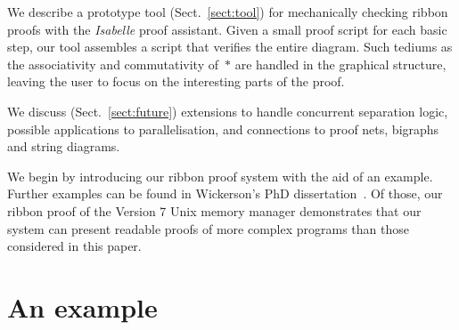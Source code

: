 \documentclass[runningheads,a4paper]{llncs}
\begin{document}
We describe a prototype tool (Sect.~\ref{sect:tool}) for mechanically checking ribbon proofs with the \emph{Isabelle} proof assistant. Given a small proof script for each basic step, our tool assembles a script that verifies the entire diagram. Such tediums as the associativity and commutativity of~$*$ are handled in the graphical structure, leaving the user to focus on the interesting parts of the proof. 

We discuss (Sect.~\ref{sect:future}) extensions to handle concurrent separation logic, possible applications to parallelisation, and connections to proof nets, bigraphs and string diagrams.

We begin by introducing our ribbon proof system with the aid of an example. Further examples can be found in Wickerson's PhD dissertation~\cite{wickerson13}. Of those, our ribbon proof of the Version 7 Unix memory manager demonstrates that our system can present readable proofs of more complex programs than those considered in this paper.

\section{An example}\label{sect:informal_development}

\newcommand{\lseg}[2]{\mathit{ls}\,{#1}\,{#2}}
\newcommand{\List}[2]{\mathit{list}\,{#1}\,{#2}}

\newcommand{\rev}[1]{#1^\dagger}
\end{document}
